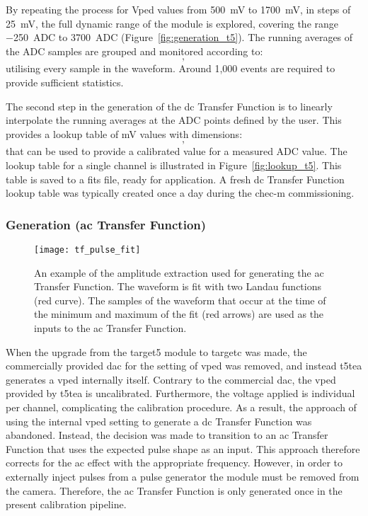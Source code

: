 By repeating the process for Vped values from \SI{500}{mV} to \SI{1700}{mV}, in steps of \SI{25}{mV}, the full dynamic range of the module is explored, covering the range \SI{-250}{ADC} to \SI{3700}{ADC} (Figure~\ref{fig:generation_t5}). The running averages of the ADC samples are grouped and monitored according to:
\begin{equation}
	[Module, Channel, Sampling~Cell, Input~Amplitude],
\end{equation}
utilising every sample in the waveform. Around 1,000 events are required to provide sufficient statistics.

The second step in the generation of the \gls{dc} Transfer Function is to linearly interpolate the running averages at the ADC points defined by the user. This provides a lookup table of \si{mV} values with dimensions:
\begin{equation}
	[Module, Channel, Sampling~Cell, ADC~Value],
\end{equation}
that can be used to provide a calibrated value for a measured ADC value. The lookup table for a single channel is illustrated in Figure~\ref{fig:lookup_t5}. This table is saved to a \gls{fits} file, ready for application. A fresh \gls{dc} Transfer Function lookup table was typically created once a day during the \gls{chec-m} commissioning.

\subsubsection{Generation (\gls{ac} Transfer Function)}

\begin{figure}
	\centering
    \texttt{[image: tf\_pulse\_fit]} 
	\caption[Fit of the waveform in order to extract samples to generate the \gls{ac} Transfer Function.]{An example of the amplitude extraction used for generating the \gls{ac} Transfer Function. The waveform is fit with two Landau functions (red curve). The samples of the waveform that occur at the time of the minimum and maximum of the fit (red arrows) are used as the inputs to the \gls{ac} Transfer Function.} 
	\label{fig:tf_pulse_fit}
\end{figure}

When the upgrade from the \gls{target5} module to \gls{targetc} was made, the commercially provided \gls{dac} for the setting of \gls{vped} was removed, and instead \gls{t5tea} generates a \gls{vped} internally itself. Contrary to the commercial \gls{dac}, the \gls{vped} provided by \gls{t5tea} is uncalibrated. Furthermore, the voltage applied is individual per channel, complicating the calibration procedure. As a result, the approach of using the internal \gls{vped} setting to generate a \gls{dc} Transfer Function was abandoned. Instead, the decision was made to transition to an \gls{ac} Transfer Function that uses the expected pulse shape as an input. This approach therefore corrects for the \gls{ac} effect with the appropriate frequency. However, in order to externally inject pulses from a pulse generator the module must be removed from the camera. Therefore, the \gls{ac} Transfer Function is only generated once in the present calibration pipeline.
	

